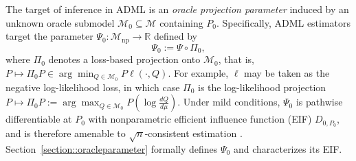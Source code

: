 \documentclass[11pt]{article}
\theoremstyle{definition}
\begin{document}
  
  

 
The target of inference in ADML is an \emph{oracle projection parameter} induced by an unknown oracle submodel \(\mathcal{M}_0 \subseteq \mathcal{M}\) containing \(P_0\). Specifically, ADML estimators target the parameter \(\Psi_0 : \mathcal{M}_{\mathrm{np}} \to \mathbb{R}\) defined by
\begin{equation}
\Psi_0 := \Psi \circ \Pi_0,
\label{eqn::oracleParam}
\end{equation}
where \(\Pi_0\) denotes a loss-based projection onto \(\mathcal{M}_0\), that is, \(P \mapsto \Pi_0 P \in \arg\min_{Q \in \mathcal{M}_0} P\ell(\cdot,Q)\). For example, \(\ell\) may be taken as the negative log-likelihood loss, in which case \(\Pi_0\) is the log-likelihood projection \(P \mapsto \Pi_0 P := \arg\max_{Q \in \mathcal{M}_0} P\!\left(\log \frac{dQ}{d\mu}\right)\). Under mild conditions, \(\Psi_0\) is pathwise differentiable at \(P_0\) with nonparametric efficient influence function (EIF) \(D_{0,P_0}\), and is therefore amenable to \(\sqrt{n}\)-consistent estimation \citep{bickel1993efficient}. Section~\ref{section::oracleparameter} formally defines \(\Psi_0\) and characterizes its EIF.
\end{document}
